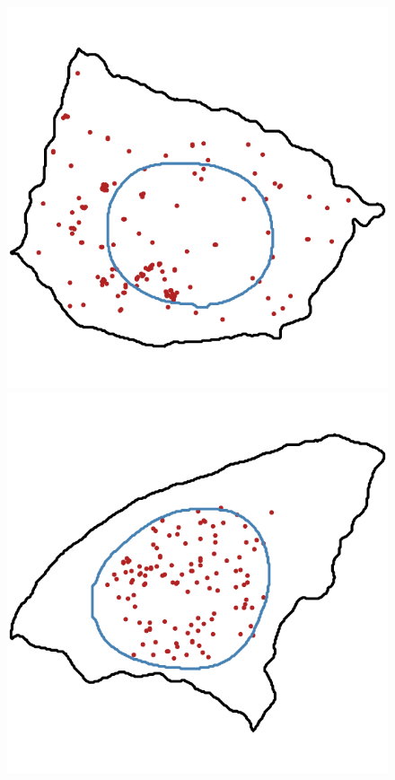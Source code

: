 \begin{figure}[h]
	\centering
		\includegraphics[width=\linewidth]{figures/introduction/real_coord_foci}
	\endminipage\hfill
		\includegraphics[width=\linewidth]{figures/introduction/real_coord_intranuclear}

\end{figure}
